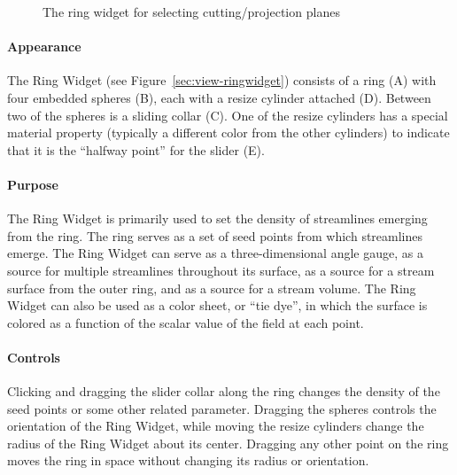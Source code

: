 \begin{figure}[htb]
  \begin{makeimage}
  \end{makeimage}
  \ringwidget
  \caption{\label{fig:ringwidget} The ring widget for selecting
    cutting/projection planes}
\end{figure}


\paragraph{Appearance} The Ring
Widget (see Figure~\ref{sec:view-ringwidget}) consists of a ring (A)
with four embedded spheres (B), each with a resize cylinder
attached (D).  Between two of the spheres is a sliding collar (C).
One of the resize cylinders has a special material property (typically
a different color from the other cylinders) to indicate that it is the
``halfway point'' for the slider (E).

\paragraph{Purpose} The Ring Widget is primarily used to set the
density of streamlines emerging from the ring. The ring serves as a set of
seed points from which streamlines emerge. The Ring Widget can 
serve as a three-dimensional angle gauge, as a source for multiple
streamlines throughout its surface, as a source for a stream surface from
the outer ring, and as a source for a stream volume.  The Ring Widget can 
also be used as a color sheet, or ``tie dye'', in which the surface is colored as 
a function of the scalar value of the field at each point.

\paragraph{Controls} Clicking and dragging the slider collar along the
ring changes the density of the seed points or some other related
parameter.  Dragging the spheres controls the orientation of the Ring
Widget, while moving the resize cylinders change the radius of the Ring
Widget about its center.  Dragging any other point on the ring moves the
ring in space without changing its radius or orientation.


